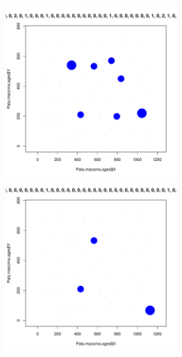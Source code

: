 \documentclass[12pt, a4paper]{disser}
\begin{document}
	\begin{figure}[h]

	\begin{minipage}[b]{.46\linewidth}
	\begin{center}
		\includegraphics[width=65mm]{./Pala_macoma_age_bubb_N13_.pdf}
	\end{center}
	\end{minipage}
%
	\hfil %
%
	\begin{minipage}[b]{.46\linewidth}
	\begin{center}
		\includegraphics[width=65mm]{./Pala_macoma_age_bubb_N14_.pdf}
	\end{center}
	\end{minipage}

	\end{figure}
\end{document}
